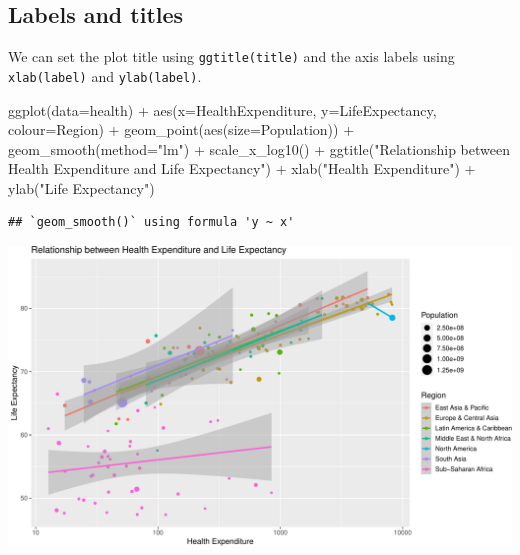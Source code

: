 \documentclass[
]{book}
\newenvironment{Shaded}{\begin{snugshade}}{\end{snugshade}}
\newcommand{\AttributeTok}[1]{\textcolor[rgb]{0.77,0.63,0.00}{#1}}
\newcommand{\FunctionTok}[1]{\textcolor[rgb]{0.00,0.00,0.00}{#1}}
\newcommand{\NormalTok}[1]{#1}
\newcommand{\SpecialCharTok}[1]{\textcolor[rgb]{0.00,0.00,0.00}{#1}}
\newcommand{\StringTok}[1]{\textcolor[rgb]{0.31,0.60,0.02}{#1}}
\begin{document}
\hypertarget{labels-and-titles}{%
\subsection{Labels and titles}\label{labels-and-titles}}

We can set the plot title using \texttt{ggtitle(title)} and the axis labels using \texttt{xlab(label)} and \texttt{ylab(label)}.

\begin{Shaded}
\begin{Highlighting}[]
\FunctionTok{ggplot}\NormalTok{(}\AttributeTok{data=}\NormalTok{health) }\SpecialCharTok{+} 
    \FunctionTok{aes}\NormalTok{(}\AttributeTok{x=}\NormalTok{HealthExpenditure,  }\AttributeTok{y=}\NormalTok{LifeExpectancy, }\AttributeTok{colour=}\NormalTok{Region) }\SpecialCharTok{+}
    \FunctionTok{geom\_point}\NormalTok{(}\FunctionTok{aes}\NormalTok{(}\AttributeTok{size=}\NormalTok{Population)) }\SpecialCharTok{+}
    \FunctionTok{geom\_smooth}\NormalTok{(}\AttributeTok{method=}\StringTok{"lm"}\NormalTok{)  }\SpecialCharTok{+}
    \FunctionTok{scale\_x\_log10}\NormalTok{() }\SpecialCharTok{+}
    \FunctionTok{ggtitle}\NormalTok{(}\StringTok{"Relationship between Health Expenditure and Life Expectancy"}\NormalTok{) }\SpecialCharTok{+}
    \FunctionTok{xlab}\NormalTok{(}\StringTok{"Health Expenditure"}\NormalTok{) }\SpecialCharTok{+}
    \FunctionTok{ylab}\NormalTok{(}\StringTok{"Life Expectancy"}\NormalTok{)    }
\end{Highlighting}
\end{Shaded}

\begin{verbatim}
## `geom_smooth()` using formula 'y ~ x'
\end{verbatim}

\includegraphics[width=\textwidth]{bookdown-demo_files/figure-latex/unnamed-chunk-60-1}
\end{document}
